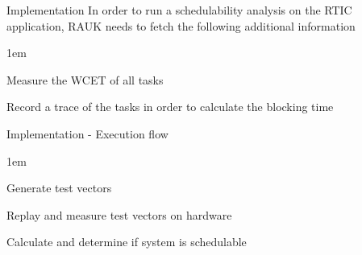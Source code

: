\begin{frame}{Implementation}
    In order to run a schedulability analysis on the RTIC application,
    RAUK needs to fetch the following additional information
    \vspace{1em}
    \begin{itemize-size}{1em}
        \item Measure the WCET of all tasks
        \item Record a trace of the tasks in order to
        calculate the blocking time
    \end{itemize-size}     
\end{frame}

\begin{frame}{Implementation - Execution flow}
    \begin{itemize-size}{1em}
        \item Generate test vectors
        \item Replay and measure test vectors on hardware
        \item Calculate and determine if system is schedulable
    \end{itemize-size}
    
\end{frame}

